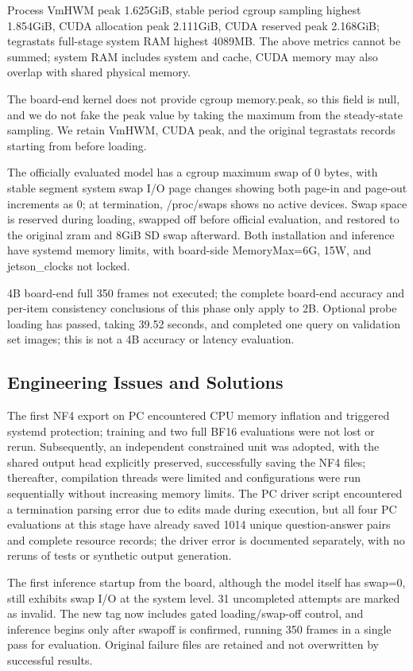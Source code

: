 Process VmHWM peak 1.625GiB, stable period cgroup sampling highest 1.854GiB, CUDA allocation peak 2.111GiB, CUDA reserved peak 2.168GiB; tegrastats full-stage system RAM highest 4089MB. The above metrics cannot be summed; system RAM includes system and cache, CUDA memory may also overlap with shared physical memory.

The board-end kernel does not provide cgroup memory.peak, so this field is null, and we do not fake the peak value by taking the maximum from the steady-state sampling. We retain VmHWM, CUDA peak, and the original tegrastats records starting from before loading.

The officially evaluated model has a cgroup maximum swap of 0 bytes, with stable segment system swap I/O page changes showing both page-in and page-out increments as 0; at termination, /proc/swaps shows no active devices. Swap space is reserved during loading, swapped off before official evaluation, and restored to the original zram and 8GiB SD swap afterward. Both installation and inference have systemd memory limits, with board-side MemoryMax=6G, 15W, and jetson\_clocks not locked.

4B board-end full 350 frames not executed; the complete board-end accuracy and per-item consistency conclusions of this phase only apply to 2B. Optional probe loading has passed, taking 39.52 seconds, and completed one query on validation set images; this is not a 4B accuracy or latency evaluation.

\subsection{Engineering Issues and Solutions}\label{s22-detail-6}

The first NF4 export on PC encountered CPU memory inflation and triggered systemd protection; training and two full BF16 evaluations were not lost or rerun. Subsequently, an independent constrained unit was adopted, with the shared output head explicitly preserved, successfully saving the NF4 files; thereafter, compilation threads were limited and configurations were run sequentially without increasing memory limits. The PC driver script encountered a termination parsing error due to edits made during execution, but all four PC evaluations at this stage have already saved 1014 unique question-answer pairs and complete resource records; the driver error is documented separately, with no reruns of tests or synthetic output generation.

The first inference startup from the board, although the model itself has swap=0, still exhibits swap I/O at the system level. 31 uncompleted attempts are marked as invalid. The new tag now includes gated loading/swap-off control, and inference begins only after swapoff is confirmed, running 350 frames in a single pass for evaluation. Original failure files are retained and not overwritten by successful results.

